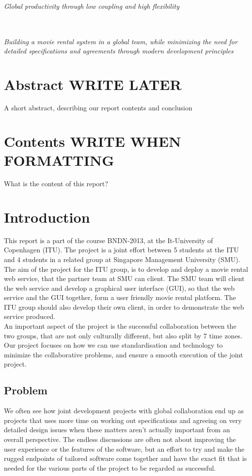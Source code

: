 \documentclass[10pt,a4paper]{article}
\begin{document}
\tableofcontents
\newpage

\begin{huge}
\emph{Global productivity through low coupling and high flexibility}
\end{huge} \\ \\
\emph{Building a movie rental system in a global team, while minimizing the need for detailed specifications and agreements through modern development principles}

\section{Abstract WRITE LATER}
A short abstract, describing our report contents and conclusion
\section{Contents WRITE WHEN FORMATTING}
What is the content of this report?

\newpage

\section{Introduction}
This report is a part of the course BNDN-2013, at the It-University of Copenhagen (ITU). The project is a joint effort between 5 students at the ITU and 4 students in a related group at Singapore Management University (SMU). \\

The aim of the project for the ITU group, is to develop and deploy a movie rental web service, that the partner team at SMU can client. The SMU team will client the web service and develop a graphical user interface (GUI), so that the web service and the GUI together, form a user friendly movie rental platform. The ITU group should also develop their own client, in order to demonstrate the web service produced. \\

An important aspect of the project is the successful collaboration between the two groups, that are not only culturally different, but also split by 7 time zones. Our project focuses on how we can use standardisation and technology to minimize the collaborative problems, and ensure a smooth execution of the joint project.

\subsection{Problem}
We often see how joint development projects with global collaboration end up as projects that uses more time on working out specifications and agreeing on very detailed design issues when these matters aren’t actually important from an overall perspective. The endless discussions are often not about improving the user experience or the features of the software, but an effort to try and make the rugged endpoints of tailored software come together and have the exact fit that is needed for the various parts of the project to be regarded as successful. \\
\end{document}
